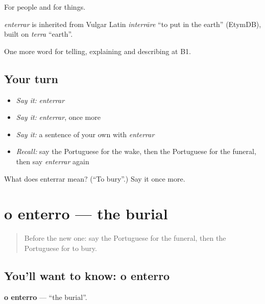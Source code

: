 For people and for things.

\begin{cousinweb}
\emph{enterrar} is inherited from Vulgar Latin \emph{interrāre} \textquotedblleft{}to put in the earth\textquotedblright{} (EtymDB), built on \emph{terra} \textquotedblleft{}earth\textquotedblright{}.
\end{cousinweb}

\begin{grammarlens}[title={What you've built}]
One more word for telling, explaining and describing at B1.
\end{grammarlens}

\subsection*{Your turn}
\begin{itemize}
\raggedright
  \item \emph{Say it:} \emph{enterrar}
  \item \emph{Say it:} \emph{enterrar}, once more
  \item \emph{Say it:} a sentence of your own with \emph{enterrar}
  \item \emph{Recall:} say the Portuguese for the wake, then the Portuguese for the funeral, then say \emph{enterrar} again
\end{itemize}

\begin{tcolorbox}[breakable,colback=teal!4,colframe=teal!35!black,title={Before you move on}]
What does enterrar mean? (\textquotedblleft{}To bury\textquotedblright{}.) Say it once more.
\end{tcolorbox}
\section[o enterro]{o enterro — the burial}

\label{lesson:PT-C315-enterro}



\begin{quote}
Before the new one: say the Portuguese for the funeral, then the Portuguese for to bury.
\end{quote}

\subsection*{You'll want to know: o enterro}
\textbf{o enterro} — \textquotedblleft{}the burial\textquotedblright{}.

